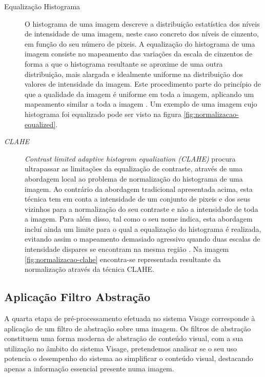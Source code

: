 \begin{description}
\item[Equalização Histograma]
O histograma de uma imagem descreve a distribuição estatística dos níveis de intensidade de uma imagem, neste caso concreto dos níveis de cinzento, em função do seu número de pixeis. A equalização do histograma de uma imagem consiste no mapeamento das variações da escala de cinzentos de forma a que o histograma resultante se aproxime de uma outra distribuição, mais alargada e idealmente uniforme na distribuição dos valores de intensidade da imagem. Este procedimento parte do princípio de que a qualidade da imagem é uniforme em toda a imagem, aplicando um mapeamento similar a toda a imagem \cite{Bradski2008}. Um exemplo de uma imagem cujo histograma foi equalizado pode ser visto na figura \ref{fig:normalizacao-equalized}.
\end{description}

\begin{description}
\item[\textit{CLAHE}]
\textit{Contrast limited adaptive histogram equalization (CLAHE)} procura ultrapassar as limitações da equalização de contraste, através de uma abordagem local ao problema de normalização do histograma de uma imagem. Ao contrário da abordagem tradicional apresentada acima, esta técnica tem em conta a intensidade de um conjunto de pixeis e dos seus vizinhos para a normalização do seu contraste e não a intensidade de toda a imagem. Para além disso, tal como o seu nome indica, esta abordagem incluí ainda um limite para o qual a equalização do histograma é realizada, evitando assim o mapeamento demasiado agressivo quando duas escalas de intensidade dispares se encontram na mesma região \cite{Reza2004}. Na imagem \ref{fig:normalizacao-clahe} encontra-se representada resultante da normalização através da técnica CLAHE.
\end{description}

\subsection{Aplicação Filtro Abstração} \label{sec:filtros}
A quarta etapa de pré-processamento efetuada no sistema Visage corresponde à aplicação de um filtro de abstração sobre uma imagem. Os filtros de abstração constituem uma forma moderna de abstração de conteúdo visual, com a sua utilização no âmbito do sistema Visage, pretendemos analisar se o seu uso potencia o desempenho do sistema ao simplificar o conteúdo visual, destacando apenas a informação essencial presente numa imagem.

